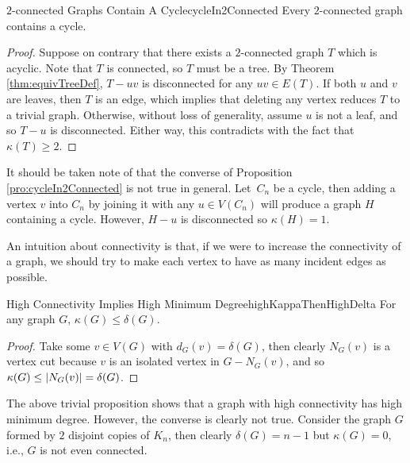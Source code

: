 \documentclass[math]{amznotes}
\theoremstyle{remark}
\newcommand{\0}{\mathbf{0}}
\newcommand{\1}{\mathbf{1}}
\begin{document}
\begin{probox}{$2$-connected Graphs Contain A Cycle}{cycleIn2Connected}
    Every $2$-connected graph contains a cycle.
    \tcblower
    \begin{proof}
        Suppose on contrary that there exists a $2$-connected graph $T$ which is acyclic. Note that $T$ is connected, so $T$ must be a tree. By Theorem \ref{thm:equivTreeDef}, $T - uv$ is disconnected for any $uv \in E(T)$. If both $u$ and $v$ are leaves, then $T$ is an edge, which implies that deleting any vertex reduces $T$ to a trivial graph. Otherwise, without loss of generality, assume $u$ is not a leaf, and so $T - u$ is disconnected. Either way, this contradicts with the fact that $\kappa(T) \geq 2$.
    \end{proof}
\end{probox}
It should be taken note of that the converse of Proposition \ref{pro:cycleIn2Connected} is not true in general. Let~$C_n$ be a cycle, then adding a vertex $v$ into $C_n$ by joining it with any $u \in V(C_n)$ will produce a graph $H$ containing a cycle. However, $H - u$ is disconnected so $\kappa(H) = 1$.

An intuition about connectivity is that, if we were to increase the connectivity of a graph, we should try to make each vertex to have as many incident edges as possible.
\begin{probox}{High Connectivity Implies High Minimum Degree}{highKappaThenHighDelta}
    For any graph $G$, $\kappa(G) \leq \delta(G)$.
    \tcblower
    \begin{proof}
        Take some $v \in V(G)$ with $d_G(v) = \delta(G)$, then clearly $N_G(v)$ is a vertex cut because $v$ is an isolated vertex in $G - N_G(v)$, and so $\kappa(G) \leq {\left\lvert {N_G(v)} \right\rvert} = \delta(G)$.
    \end{proof}
\end{probox}
The above trivial proposition shows that a graph with high connectivity has high minimum degree. However, the converse is clearly not true. Consider the graph $G$ formed by $2$ disjoint copies of $K_n$, then clearly $\delta(G) = n - 1$ but $\kappa(G) = 0$, i.e., $G$ is not even connected.
\end{document}

